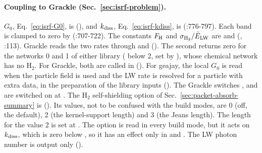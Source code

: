 \paragraph{Coupling to Grackle (Sec.~\ref{sec:isrf-problem}).} $G_0$,
Eq.~\eqref{eq:isrf-G0}, is 
(), and $k_{\rm diss}$,
Eq.~\eqref{eq:isrf-kdiss}, is
 (:776-797). Each
band is clamped to zero by 
(:707-722). The constants $F_{\rm H}$ and $\sigma_{\rm H_2}/\bar E_{\rm LW}$ are
 and
(, :113). Grackle reads the two rates
through  and
(). The second
returns zero for the networks 0 and 1 of either library
( below 2, set by ), whose
chemical network has no H$_2$. For Grackle, both are called in
 ().
For geajay, the local $G_0$ is read when the particle field is used and the
LW rate is resolved for a particle with extra data, in the preparation of the
library inputs (). The Grackle
switches ,
 and  are switched on at
. The H$_2$ self-shielding option of
Sec.~\ref{sec:packet-absorb-summary} is 
(). Its values, not to be
confused with the build modes, are 0 (off, the default), 2 (the kernel-support
length) and 3 (the Jeans length). The length for the value 2 is set at
. The option is read in every
build mode, but it acts on $k_{\rm diss}$, which is zero below
, so it has an effect only in  and
. The LW photon
number is output only
().

